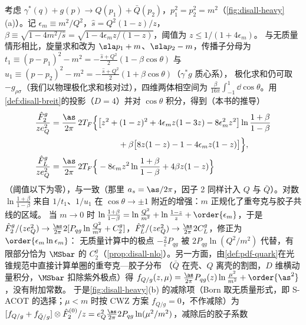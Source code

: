 \begin{example}\label{ex:disall-heavy-lo}
考虑 $\gamma^*(q)+g(p)\to Q(p_1)+\bar Q(p_2)$，$p_1^2=p_2^2=m^2$（\cref{fig:disall-heavy}(a)）。记 $\epsilon_m\equiv m^2/Q^2$，$\hat s=Q^2(1-z)/z$，$\beta\equiv\sqrt{1-4m^2/\hat s}=\sqrt{1-4\epsilon_mz/(1-z)}$，阈值为 $z\le1/(1+4\epsilon_m)$。
与无质量情形相比，旋量求和改为 $\sla p_1+m$、$\sla p_2-m$，传播子分母为 $t_1\equiv(p-p_1)^2-m^2=-\frac{\hat s+Q^2}2(1-\beta\cos\theta)$ 与 $u_1\equiv(p-p_2)^2-m^2=-\frac{\hat s+Q^2}2(1+\beta\cos\theta)$（$\gamma^*g$ 质心系），
极化求和仍可取 $-g_{\rho\sigma}$（我们以物理极化求和核对过），四维两体相空间为 $\frac\beta{16\pi}\int_{-1}^1\dd\cos\theta$。用\cref{def:disall-breit}的投影（$D=4$）并对 $\cos\theta$ 积分，得到（本书的推导）
\begin{equation}\label{eq:disall-heavy-lo}
\begin{aligned}
\frac{\hat F^g_2}{ze_Q^2}&=\frac{\as}{2\pi}\,2T_F\Big\{\big[z^2+(1-z)^2+4\epsilon_mz(1-3z)-8\epsilon_m^2z^2\big]\ln\frac{1+\beta}{1-\beta}\\
&\hspace{8.2em}+\beta\big[8z(1-z)-1-4\epsilon_mz(1-z)\big]\Big\},\\
\frac{\hat F^g_L}{ze_Q^2}&=\frac{\as}{2\pi}\,2T_F\Big\{-8\epsilon_mz^2\ln\frac{1+\beta}{1-\beta}+4\beta z(1-z)\Big\}
\end{aligned}
\end{equation}
（阈值以下为零），与\cite[式~(49)--(53)]{Forte:2010ta}一致（那里 $a_s=\as/2\pi$，因子 2 同样计入 $Q$ 与 $\bar Q$）。对数 $\ln\frac{1+\beta}{1-\beta}$ 来自 $1/t_1$、$1/u_1$ 在 $\cos\theta\to\pm1$ 附近的增强：$m$ 正规化了重夸克与胶子共线的区域。
当 $m\to0$ 时 $\ln\frac{1+\beta}{1-\beta}=\ln\frac{Q^2}{m^2}+\ln\frac{1-z}z+\order{\epsilon_m}$，于是
$\hat F^g_2/(ze_Q^2)\to\frac{\as}{2\pi}2[P_{qg}\ln\frac{Q^2}{m^2}+C_2^g]$，$\hat F^g_L/(ze_Q^2)\to\frac{\as}{2\pi}2C_L^g$，修正为 $\order{\epsilon_m\ln\epsilon_m}$：
无质量计算中的极点 $-\frac2\varepsilon P_{qg}$ 被 $2P_{qg}\ln(Q^2/m^2)$ 代替，有限部分恰为 $\MSbar$ 的 $C_2^g$（\cref{prop:disall-nlo}）。另一方面，由\cref{def:pdf-quark}在光锥规范中直接计算单圈的重夸克—胶子分布
（$\bar Q$ 在壳、$Q$ 离壳的割图，$D$ 维横动量积分，$\MSbar$ 扣除紫外极点）得 $f_{Q/g}(z,\mu)=\frac{\as}{2\pi}P_{qg}(z)\ln\frac{\mu^2}{m^2}+\order{\as^2}$，没有附加常数。
于是\cref{fig:disall-heavy}(b) 的减除项（Born 取无质量形式，即 S-ACOT 的选择\cite{Kramer:2000hn}；$\mu<m$ 时按 CWZ 方案 $f_{Q/g}=0$，不作减除）为 $[f_{Q/g}+f_{\bar Q/g}]\otimes\hat F^{(0)}_2/z=e_Q^2\frac{\as}{2\pi}2P_{qg}\ln(\mu^2/m^2)$，减除后的胶子系数

\end{example}
